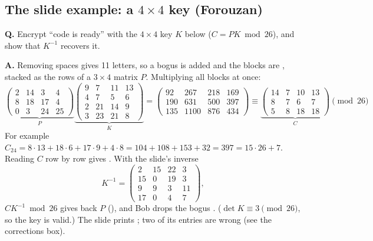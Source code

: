 \subsection{The slide example: a $4\times4$ key (Forouzan)}
\begin{worked}
\textbf{Q.} Encrypt ``code is ready'' with the $4\times4$ key $K$ below ($C = PK \bmod 26$), and show that $K^{-1}$ recovers it.

\textbf{A.} Removing spaces gives 11 letters, so a bogus  is added and the blocks are , stacked as the rows of a $3\times4$ matrix $P$. Multiplying all blocks at once:
\[
\underbrace{\begin{pmatrix}2&14&3&4\\8&18&17&4\\0&3&24&25\end{pmatrix}}_{P}
\underbrace{\begin{pmatrix}9&7&11&13\\4&7&5&6\\2&21&14&9\\3&23&21&8\end{pmatrix}}_{K}
= \begin{pmatrix}92&267&218&169\\190&631&500&397\\135&1100&876&434\end{pmatrix}
\equiv \underbrace{\begin{pmatrix}14&7&10&13\\8&7&6&7\\5&8&18&18\end{pmatrix}}_{C} \pmod{26}
\]
For example $C_{24} = 8\cdot13 + 18\cdot6 + 17\cdot9 + 4\cdot8 = 104 + 108 + 153 + 32 = 397 = 15\cdot26 + 7$. Reading $C$ row by row gives \textbf{}. With the slide's inverse
\[
K^{-1} = \begin{pmatrix}2&15&22&3\\15&0&19&3\\9&9&3&11\\17&0&4&7\end{pmatrix},
\]
$CK^{-1} \bmod 26$ gives back $P$ (), and Bob drops the bogus . ($\det K \equiv 3 \pmod{26}$, so the key is valid.) The slide prints ; two of its entries are wrong (see the corrections box).
\end{worked}

